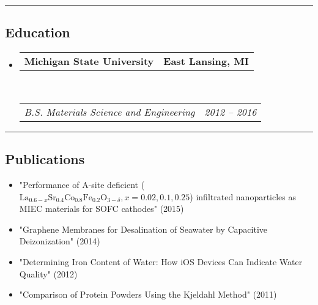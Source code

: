 \documentclass[10pt,letterpaper]{article}
\makeatletter
\newcommand{\headerrow}[2]
{\begin{tabular*}{\linewidth}{l@{\extracolsep{\fill}}r}
  #1 &
  #2 \\
\end{tabular*}}
\makeatother
\begin{document}
\hrule
\vspace{-0.6em}
\subsection*{Education}

\begin{itemize}
  \parskip=0.1em

  \item 
  \headerrow
    {\textbf{Michigan State University}}
    {\textbf{East Lansing, MI}}
  \\
  \headerrow
    {\emph{B.S. Materials Science and Engineering}}
    {\emph{2012 -- 2016}}

\end{itemize}


\hrule
\vspace{-0.6em}
\subsection*{Publications}

\begin{itemize}
  \parskip=0.1em

  \item "Performance of A-site deficient ($\text{La}_{0.6-x}\text{Sr}_{0.4}\text{Co}_{0.8}\text{Fe}_{0.2}\text{O}_{3-\delta}, x = 0.02, 0.1, 0.25$) infiltrated nanoparticles as MIEC materials for SOFC cathodes" (2015)
  \item "Graphene Membranes for Desalination of Seawater by Capacitive Deizonization" (2014)
  \item "Determining Iron Content of Water: How iOS Devices Can Indicate Water Quality" (2012)
  \item "Comparison of Protein Powders Using the Kjeldahl Method" (2011)
\end{itemize}
\end{document}
